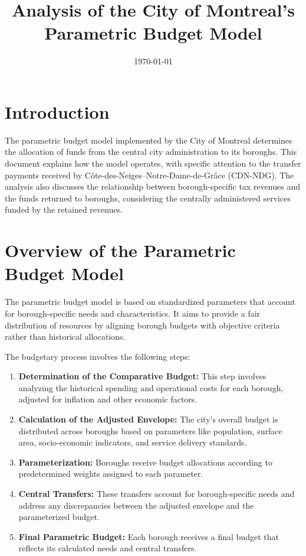 \documentclass{article}
\title{Analysis of the City of Montreal's Parametric Budget Model}
\author{}
\date{\today}
\begin{document}
\maketitle

\section{Introduction}
The parametric budget model implemented by the City of Montreal determines the allocation of funds from the central city administration to its boroughs. This document explains how the model operates, with specific attention to the transfer payments received by Côte-des-Neiges–Notre-Dame-de-Grâce (CDN-NDG). The analysis also discusses the relationship between borough-specific tax revenues and the funds returned to boroughs, considering the centrally administered services funded by the retained revenues.

\section{Overview of the Parametric Budget Model}
The parametric budget model is based on standardized parameters that account for borough-specific needs and characteristics. It aims to provide a fair distribution of resources by aligning borough budgets with objective criteria rather than historical allocations.

The budgetary process involves the following steps:

\begin{enumerate}
    \item \textbf{Determination of the Comparative Budget:} This step involves analyzing the historical spending and operational costs for each borough, adjusted for inflation and other economic factors.
    \item \textbf{Calculation of the Adjusted Envelope:} The city's overall budget is distributed across boroughs based on parameters like population, surface area, socio-economic indicators, and service delivery standards.
    \item \textbf{Parameterization:} Boroughs receive budget allocations according to predetermined weights assigned to each parameter.
    \item \textbf{Central Transfers:} These transfers account for borough-specific needs and address any discrepancies between the adjusted envelope and the parameterized budget.
    \item \textbf{Final Parametric Budget:} Each borough receives a final budget that reflects its calculated needs and central transfers.
\end{enumerate}
\end{document}
